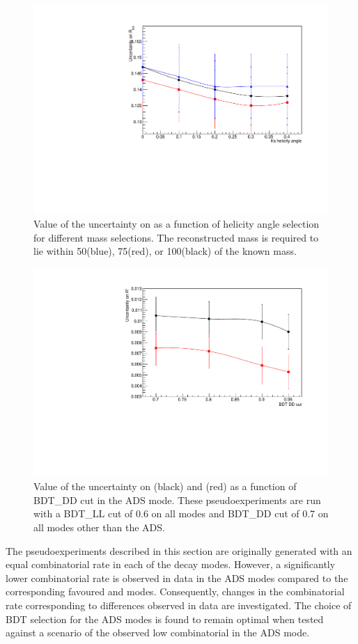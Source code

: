 \begin{figure}
\centering
\includegraphics[width=0.8\linewidth]{figures/selection/optimisation.pdf}
\caption{Value of the uncertainty on \Rkk as a function of \KS helicity angle selection for different \Kstar mass selections. The reconstructed \Kstarm mass is required to lie within 50\mevcc (blue), 75\mevcc (red), or 100\mevcc (black) of the known \Kstar mass.}
\label{optimisation}
\end{figure}

\begin{figure}
\centering
\includegraphics[width=0.8\linewidth]{figures/selection/ADSoptimisation.pdf}
\caption{Value of the uncertainty on \Rptwo (black) and \Rmtwo (red) as a function of BDT\_DD cut in the ADS mode. These pseudoexperiments are run with a BDT\_LL cut of 0.6 on all modes and BDT\_DD cut of 0.7 on all modes other than the ADS.}
\label{adsoptimisation}
\end{figure}

The pseudoexperiments described in this section are originally generated with an equal combinatorial rate in each of the \Dz decay modes. However, a significantly lower combinatorial rate is observed in data in the ADS modes compared to the corresponding favoured \kpi and \kpipipi modes. Consequently, changes in the combinatorial rate corresponding to differences observed in data are investigated. The choice of BDT selection for the ADS modes is found to remain optimal when tested against a scenario of the observed low combinatorial in the ADS mode. 

